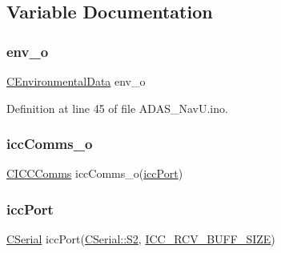 \subsection{Variable Documentation}
\mbox{\label{_a_d_a_s___nav_u_8ino_a6c839a9b171c9b833a61a0d7612e2da8}} 
\subsubsection{\texorpdfstring{env\_o}{env\_o}}
{\footnotesize\ttfamily \mbox{\hyperlink{class_c_environmental_data}{C\+Environmental\+Data}} env\+\_\+o}



Definition at line 45 of file A\+D\+A\+S\+\_\+\+Nav\+U.\+ino.

\mbox{\label{_a_d_a_s___nav_u_8ino_a62ef6b3308259edb69af585549178324}} 
\subsubsection{\texorpdfstring{iccComms\_o}{iccComms\_o}}
{\footnotesize\ttfamily \mbox{\hyperlink{class_c_i_c_c_comms}{C\+I\+C\+C\+Comms}} icc\+Comms\+\_\+o(\mbox{\hyperlink{_a_d_a_s___nav_u_8ino_ad1e6d9fed4369104e412a46c019634d2}{icc\+Port}})}

\mbox{\label{_a_d_a_s___nav_u_8ino_ad1e6d9fed4369104e412a46c019634d2}} 
\subsubsection{\texorpdfstring{iccPort}{iccPort}}
{\footnotesize\ttfamily \mbox{\hyperlink{class_c_serial}{C\+Serial}} icc\+Port(\mbox{\hyperlink{class_c_serial_a000039540cc90b18bafacf5744e7eda2a8cc95f4591147b0df028e003f82220a1}{C\+Serial\+::\+S2}}, \mbox{\hyperlink{_a_d_a_s___cfg_8h_abf41bed56ee0b2a8858687c4420bb110}{I\+C\+C\+\_\+\+R\+C\+V\+\_\+\+B\+U\+F\+F\+\_\+\+S\+I\+ZE}})}

\mbox{\label{_a_d_a_s___nav_u_8ino_a8abc3c3b0c6950fd83525420d5ca0dd2}} 
